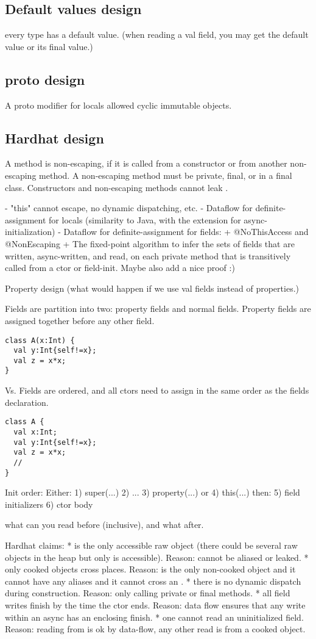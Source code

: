 

\subsection{Default values design}
every type has a default value.
(when reading a val field, you may get the default value or its final value.)

\subsection{proto design}
A proto modifier for locals
allowed cyclic immutable objects.

\subsection{Hardhat design}
A method is non-escaping, if it is called from a constructor or from another non-escaping method.
A non-escaping method must be private, final, or in a final class.
Constructors and non-escaping methods cannot leak \this.


- "this" cannot escape, no dynamic dispatching, etc.
- Dataflow for definite-assignment for locals (similarity to Java, with the extension for async-initialization)
- Dataflow for definite-assignment for fields:
  + @NoThisAccess and @NonEscaping
  + The fixed-point algorithm to infer the sets of fields that are written, async-written, and read, on each private method that is transitively called from a ctor or field-init. Maybe also add a nice proof :)


Property design (what would happen if we use val fields instead of properties.)

Fields are partition into two: property fields and normal fields. Property fields are assigned together before any other field.
\begin{lstlisting}
class A(x:Int) {
  val y:Int{self!=x};
  val z = x*x;
}
\end{lstlisting}
Vs.
Fields are ordered, and all ctors need to assign in the same order as the fields declaration.
\begin{lstlisting}
class A {
  val x:Int;
  val y:Int{self!=x};
  val z = x*x;
  //
}
\end{lstlisting}


Init order:
Either:
1) super(...)
2) ...
3) property(...)
or
4) this(...)
then:
5) field initializers
6) ctor body

what can you read before (inclusive), and what after.


Hardhat claims:
* \this is the only accessible raw object (there could be several raw objects in the heap but only \this is accessible). Reason: \this cannot be aliased or leaked.
* only cooked objects cross places. Reason: \this is the only non-cooked object and it cannot have any aliases and it cannot cross an .
* there is no dynamic dispatch during construction. Reason: only calling private or final methods.
* all field writes finish by the time the ctor ends. Reason: data flow ensures that any write within an async has an enclosing finish.
* one cannot read an uninitialized field. Reason: reading from \this is ok by data-flow, any other read is from a cooked object.
